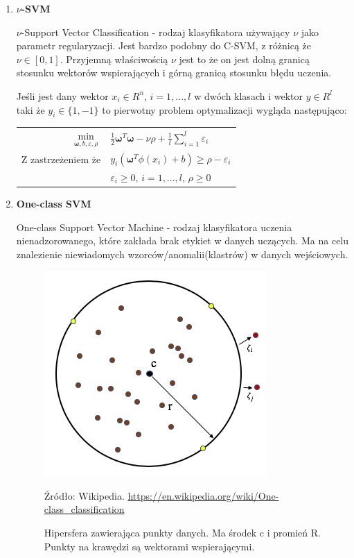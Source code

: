 \documentclass[paper=a4, fontsize=11pt]{scrartcl} %
\numberwithin{equation}{section} %
\numberwithin{figure}{section} %
\newcommand*{\captionsource}[2]{%
  \caption[{#1}]{%
      #1}
    Źródło: #2%
}
\begin{document}
\begin{enumerate}
\newpage %
\item \textbf{$\nu$-SVM}
    \par $\nu$-Support Vector Classification - rodzaj klasyfikatora używający $\nu$ jako
    parametr regularyzacji. Jest bardzo podobny do C-SVM, z różnicą że $\nu\in[0,1]$.
    Przyjemną właściwością $\nu$ jest to że on jest dolną granicą stosunku wektorów
    wspierających i górną granicą stosunku błędu uczenia.
    \par Jeśli jest dany wektor $x_i \in R^n$, $i=1,...,l$ w dwóch klasach i wektor
    $y\in R^l$ taki że $y_i \in \{1, -1\}$ to pierwotny problem optymalizacji wygląda
    następująco:

    \begin{center}
        \begin{tabular}{rl}
            $\min\limits_{\pmb{\omega},b,\varepsilon, \rho}$ &
            $\frac{1}{2}\pmb{\omega}^T\pmb{\omega} - \nu\rho + \frac{1}{l}\sum\limits_{i=1}^{l}
            \varepsilon_i$ \\
            Z zastrzeżeniem że & $y_i(\pmb{\omega}^T\phi(x_i) + b) \geq \rho - \varepsilon_i$ \\
                               & $\varepsilon_i \geq 0$, $i=1,...,l$, $\rho \geq 0$
        \end{tabular}
    \end{center}

\item \textbf{One-class SVM}
    \par One-class Support Vector Machine - rodzaj klasyfikatora uczenia
    nienadzorowanego, które zakłada brak etykiet w danych uczących. Ma na celu
    znalezienie niewiadomych wzorców/anomalii(klastrów) w danych wejściowych.  

    \begin{figure}[H]
        \begin{center}
            \includegraphics[scale=0.4]{./img/one-class-circle.png}
            \captionsource{Hipersfera zawierająca punkty danych. Ma środek c i promień R.
            Punkty na krawędzi są wektorami wspierającymi.}{Wikipedia. \url{https://en.wikipedia.org/wiki/One-class_classification}}
            \label{fig:one_class}
        \end{center}
    \end{figure}


\end{enumerate}
\end{document}
